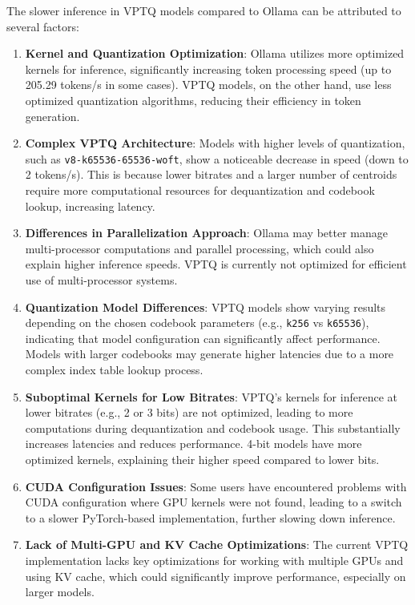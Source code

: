 \documentclass{article}
\begin{document}
The slower inference in VPTQ models compared to Ollama can be attributed to several factors:

\begin{enumerate}
    \item \textbf{Kernel and Quantization Optimization}: Ollama utilizes more optimized kernels for inference, significantly increasing token processing speed (up to 205.29 tokens/s in some cases). VPTQ models, on the other hand, use less optimized quantization algorithms, reducing their efficiency in token generation.
    
    \item \textbf{Complex VPTQ Architecture}: Models with higher levels of quantization, such as \texttt{v8-k65536-65536-woft}, show a noticeable decrease in speed (down to 2 tokens/s). This is because lower bitrates and a larger number of centroids require more computational resources for dequantization and codebook lookup, increasing latency.
    
    \item \textbf{Differences in Parallelization Approach}: Ollama may better manage multi-processor computations and parallel processing, which could also explain higher inference speeds. VPTQ is currently not optimized for efficient use of multi-processor systems.
    
    \item \textbf{Quantization Model Differences}: VPTQ models show varying results depending on the chosen codebook parameters (e.g., \texttt{k256} vs \texttt{k65536}), indicating that model configuration can significantly affect performance. Models with larger codebooks may generate higher latencies due to a more complex index table lookup process.
    
    \item \textbf{Suboptimal Kernels for Low Bitrates}: VPTQ's kernels for inference at lower bitrates (e.g., 2 or 3 bits) are not optimized, leading to more computations during dequantization and codebook usage. This substantially increases latencies and reduces performance. 4-bit models have more optimized kernels, explaining their higher speed compared to lower bits.
    
    \item \textbf{CUDA Configuration Issues}: Some users have encountered problems with CUDA configuration where GPU kernels were not found, leading to a switch to a slower PyTorch-based implementation, further slowing down inference.
    
    \item \textbf{Lack of Multi-GPU and KV Cache Optimizations}: The current VPTQ implementation lacks key optimizations for working with multiple GPUs and using KV cache, which could significantly improve performance, especially on larger models.
\end{enumerate}
\end{document}
